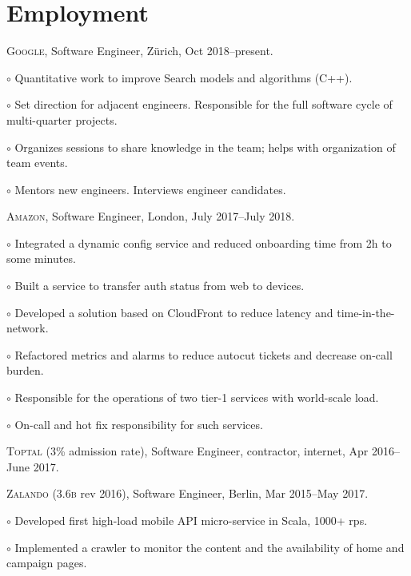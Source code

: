 \documentclass[letterpaper]{article}
\renewenvironment{itemize}{
  \begin{list}{}{
    \setlength{\leftmargin}{1.5em}
  }
}{
  \end{list}
}
\newenvironment{no-indent-itemize}{
  \begin{list}{}{
    \setlength{\leftmargin}{0em}
  }
}{
  \end{list}
}
\def\bullet{$\circ$\xspace}
\begin{document}
\section*{Employment}
\begin{no-indent-itemize}
  \item \textsc{Google}, Software Engineer, Z\"urich, Oct 2018--present.
  \begin{itemize}
    \item\bullet Quantitative work to improve Search models and algorithms (C++). 
    \item\bullet Set direction for adjacent engineers. Responsible for the full software cycle of multi-quarter projects.
    \item\bullet Organizes sessions to share knowledge in the team; helps with organization of team events.
    \item\bullet Mentors new engineers. Interviews engineer candidates.
  \end{itemize}
  \item \textsc{Amazon}, Software Engineer, London, July 2017--July 2018.
  \begin{itemize}
    \item\bullet Integrated a dynamic config service and reduced onboarding time from 2h to some minutes.
    \item\bullet Built a service to transfer auth status from web to devices.
    \item\bullet Developed a solution based on CloudFront to reduce latency and time-in-the-network.
    \item\bullet Refactored metrics and alarms to reduce autocut tickets and decrease on-call burden.
    \item\bullet Responsible for the operations of two tier-1 services with world-scale load.
    \item\bullet On-call and hot fix responsibility for such services.
  \end{itemize}
  \item \textsc{Toptal} (3\% admission rate), Software Engineer, contractor, internet, Apr 2016--June 2017.
  \item \textsc{Zalando} (3.6\textsc{b} rev 2016), Software Engineer, Berlin, Mar 2015--May 2017.
  \begin{itemize}
    \item\bullet Developed first high-load mobile API micro-service in Scala, 1000+ rps.
    \item\bullet Implemented a crawler to monitor the content and the availability of home and campaign pages.

\end{itemize}
\end{no-indent-itemize}
\end{document}
